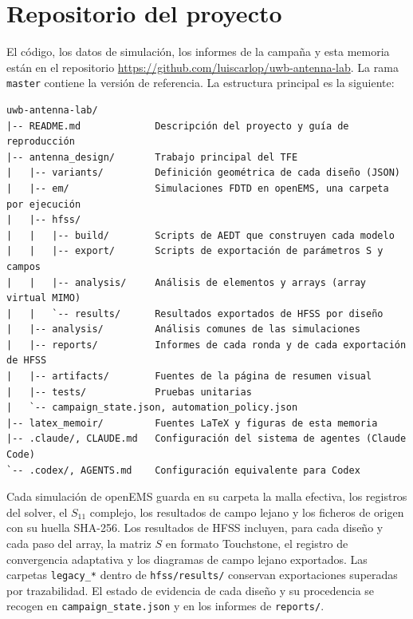\documentclass[11pt,a4paper]{article}
\begin{document}
\appendix
\section{Repositorio del proyecto}\label{app:repositorio}
El código, los datos de simulación, los informes de la campaña y esta memoria están en el repositorio
\url{https://github.com/luiscarlop/uwb-antenna-lab}. La rama \texttt{master} contiene la versión
de referencia. La estructura principal es la siguiente:

{\small
\begin{verbatim}
uwb-antenna-lab/
|-- README.md             Descripción del proyecto y guía de reproducción
|-- antenna_design/       Trabajo principal del TFE
|   |-- variants/         Definición geométrica de cada diseño (JSON)
|   |-- em/               Simulaciones FDTD en openEMS, una carpeta por ejecución
|   |-- hfss/
|   |   |-- build/        Scripts de AEDT que construyen cada modelo
|   |   |-- export/       Scripts de exportación de parámetros S y campos
|   |   |-- analysis/     Análisis de elementos y arrays (array virtual MIMO)
|   |   `-- results/      Resultados exportados de HFSS por diseño
|   |-- analysis/         Análisis comunes de las simulaciones
|   |-- reports/          Informes de cada ronda y de cada exportación de HFSS
|   |-- artifacts/        Fuentes de la página de resumen visual
|   |-- tests/            Pruebas unitarias
|   `-- campaign_state.json, automation_policy.json
|-- latex_memoir/         Fuentes LaTeX y figuras de esta memoria
|-- .claude/, CLAUDE.md   Configuración del sistema de agentes (Claude Code)
`-- .codex/, AGENTS.md    Configuración equivalente para Codex
\end{verbatim}
}

Cada simulación de openEMS guarda en su carpeta la malla efectiva, los registros del solver, el
$S_{11}$ complejo, los resultados de campo lejano y los ficheros de origen con su huella SHA-256.
Los resultados de HFSS incluyen, para cada diseño y cada paso del array, la matriz $S$ en formato
Touchstone, el registro de convergencia adaptativa y los diagramas de campo lejano exportados.
Las carpetas \texttt{legacy\_*} dentro de \texttt{hfss/results/} conservan exportaciones superadas
por trazabilidad. El estado de evidencia de cada diseño y su procedencia se recogen en
\texttt{campaign\_state.json} y en los informes de \texttt{reports/}.

\end{document}
